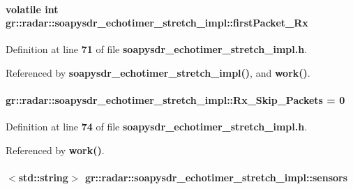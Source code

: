 \paragraph[{first\+Packet\+\_\+\+Rx}]{\setlength{\rightskip}{0pt plus 5cm}volatile {\bf int} gr\+::radar\+::soapysdr\+\_\+echotimer\+\_\+stretch\+\_\+impl\+::first\+Packet\+\_\+\+Rx\hspace{0.3cm}{\ttfamily [private]}}\label{classgr_1_1radar_1_1soapysdr__echotimer__stretch__impl_a970da9eea0f5ea8501b633d07a1d3d66}


Definition at line {\bf 71} of file {\bf soapysdr\+\_\+echotimer\+\_\+stretch\+\_\+impl.\+h}.



Referenced by {\bf soapysdr\+\_\+echotimer\+\_\+stretch\+\_\+impl()}, and {\bf work()}.

\paragraph[{Rx\+\_\+\+Skip\+\_\+\+Packets}]{ gr\+::radar\+::soapysdr\+\_\+echotimer\+\_\+stretch\+\_\+impl\+::\+Rx\+\_\+\+Skip\+\_\+\+Packets = 0\hspace{0.3cm}{\ttfamily [private]}}\label{classgr_1_1radar_1_1soapysdr__echotimer__stretch__impl_aa53c4413b0281ccf45df03d4def01343}


Definition at line {\bf 74} of file {\bf soapysdr\+\_\+echotimer\+\_\+stretch\+\_\+impl.\+h}.



Referenced by {\bf work()}.

\paragraph[{sensors}]{$<${\bf std\+::string}$>$ gr\+::radar\+::soapysdr\+\_\+echotimer\+\_\+stretch\+\_\+impl\+::sensors\hspace{0.3cm}{\ttfamily [private]}}\label{classgr_1_1radar_1_1soapysdr__echotimer__stretch__impl_a29e3ac21b484505307299c6e5dcc35aa}


